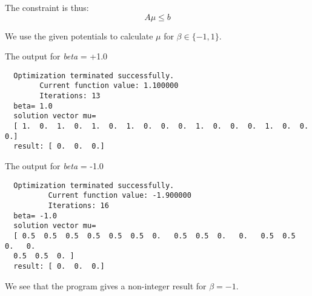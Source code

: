 \documentclass[12pt,a4paper]{scrartcl}
\begin{document}
The constraint is thus:
\[
  A \mu \leq b
\]

We use the given potentials to calculate $\mu$ for $\beta \in \{-1,1\}$.

The output for \textit{beta} = +1.0
\begin{verbatim}
  Optimization terminated successfully.
        Current function value: 1.100000    
        Iterations: 13
  beta= 1.0
  solution vector mu=
  [ 1.  0.  1.  0.  1.  0.  1.  0.  0.  0.  1.  0.  0.  0.  1.  0.  0.  0.]
  result: [ 0.  0.  0.]
\end{verbatim}

The output for \textit{beta} = -1.0
\begin{verbatim}
  Optimization terminated successfully.
          Current function value: -1.900000   
          Iterations: 16
  beta= -1.0
  solution vector mu=
  [ 0.5  0.5  0.5  0.5  0.5  0.5  0.   0.5  0.5  0.   0.   0.5  0.5  0.   0.
  0.5  0.5  0. ]
  result: [ 0.  0.  0.]
\end{verbatim}

We see that the program gives a non-integer result for $\beta=-1$.



\end{document}
